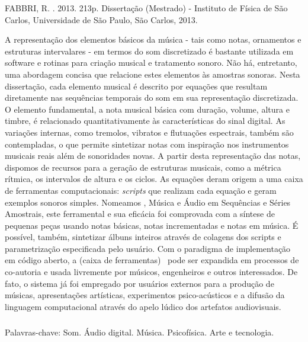 \begin{resumo2}
\vspace{-10mm}
FABBRI, R. \textbf{\ABNTtitulodata}. 2013. 213p. Dissertação (Mestrado) - Instituto de Física de São Carlos, Universidade de São Paulo, São Carlos, 2013.
\vspace{15mm}

A representação dos elementos básicos da música - tais como notas, ornamentos e estruturas intervalares - em termos do som discretizado é bastante utilizada em software e rotinas para criação musical e tratamento sonoro. Não há, entretanto, uma abordagem concisa que relacione estes elementos às amostras sonoras. Nesta dissertação, cada elemento musical é descrito por equações que resultam diretamente nas sequências temporais do som em sua representação discretizada. O elemento fundamental, a nota musical básica com duração, volume, altura e timbre, é relacionado quantitativamente às características do sinal digital. As variações internas, como tremolos, vibratos e flutuações espectrais, também são contempladas, o que permite sintetizar notas com inspiração nos instrumentos musicais reais além de sonoridades novas. A partir desta representação das notas, dispomos de recursos para a geração de estruturas musicais, como a métrica rítmica, os intervalos de altura e os ciclos. As equações deram origem a uma caixa de ferramentas computacionais: \emph{scripts} que realizam cada equação e geram exemplos sonoros simples. Nomeamos \massa, Música e Áudio em Sequências e Séries Amostrais, este ferramental e sua eficácia foi comprovada com a síntese de pequenas peças usando notas básicas, notas incrementadas e notas em música. É possível, também, sintetizar álbuns inteiros através de colagens dos scripts e parametrização especificada pelo usuário. Com o paradigma de implementação em código aberto, a (caixa de ferramentas) \massa\  pode ser expandida em processos de co-autoria e usada livremente por músicos, engenheiros e outros interessados. De fato, o sistema já foi empregado por usuários externos para a produção de músicas, apresentações artísticas, experimentos psico-acústicos e a difusão da linguagem computacional através do apelo lúdico dos artefatos audiovisuais.


$\phantom{linha em branco}$\\
Palavras-chave: Som. Áudio digital. Música. Psicofísica. Arte e tecnologia.

\end{resumo2}


\afterpage{\blankpage}

